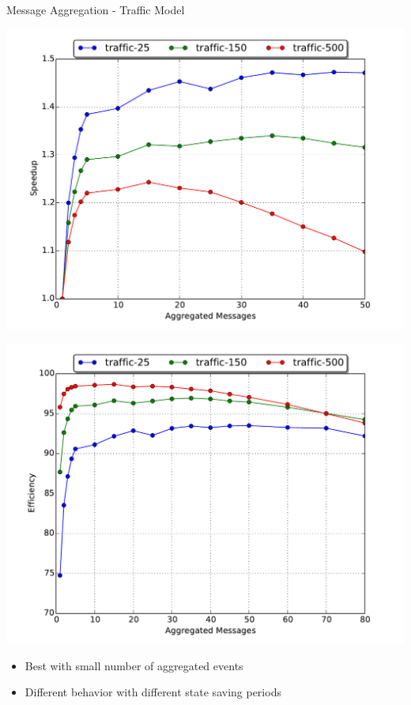 \documentclass[10pt]{beamer}
\begin{document}
\begin{frame}{Message Aggregation - Traffic Model}
    \begin{minipage}{0.5\textwidth}
        \includegraphics[width=\textwidth]{../figs/partitioning_communication/aggregate_traffic_speedup.pdf}
    \end{minipage}%
    \begin{minipage}{0.5\textwidth}
        \includegraphics[width=\textwidth]{../figs/partitioning_communication/aggregate_traffic_efficiency.pdf}
    \end{minipage}
    \begin{itemize}
        \item Best with small number of aggregated events
        \item Different behavior with different state saving periods
    \end{itemize}
\end{frame}
\end{document}
